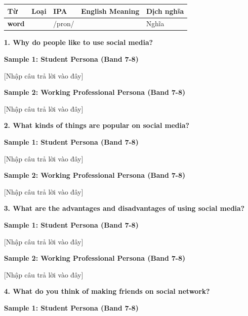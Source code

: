 \vspace{0.8em}
\begin{center}
\renewcommand{\arraystretch}{1.65}
\begin{tabularx}{\textwidth}{|V{0.22\textwidth}|C{0.07\textwidth}|I{0.20\textwidth}|Y|V{0.18\textwidth}|}
\hline
{}
\textbf{Từ} & \textbf{Loại} & \textbf{IPA} & \textbf{English Meaning} & \textbf{Dịch nghĩa} \\
\hline
\textbf{word} & & /pron/ & & Nghĩa \\ \hline
\end{tabularx}
\end{center}

\partthreeheader

\begin{ieltsquestion}
\textbf{1. Why do people like to use social media?}
\end{ieltsquestion}
\textbf{Sample 1: Student Persona (Band 7-8)}

[Nhập câu trả lời vào đây]

\textbf{Sample 2: Working Professional Persona (Band 7-8)}

[Nhập câu trả lời vào đây]

\separator

\begin{ieltsquestion}
\textbf{2. What kinds of things are popular on social media?}
\end{ieltsquestion}
\textbf{Sample 1: Student Persona (Band 7-8)}

[Nhập câu trả lời vào đây]

\textbf{Sample 2: Working Professional Persona (Band 7-8)}

[Nhập câu trả lời vào đây]

\separator

\begin{ieltsquestion}
\textbf{3. What are the advantages and disadvantages of using social media?}
\end{ieltsquestion}
\textbf{Sample 1: Student Persona (Band 7-8)}

[Nhập câu trả lời vào đây]

\textbf{Sample 2: Working Professional Persona (Band 7-8)}

[Nhập câu trả lời vào đây]

\separator

\begin{ieltsquestion}
\textbf{4. What do you think of making friends on social network?}
\end{ieltsquestion}
\textbf{Sample 1: Student Persona (Band 7-8)}

